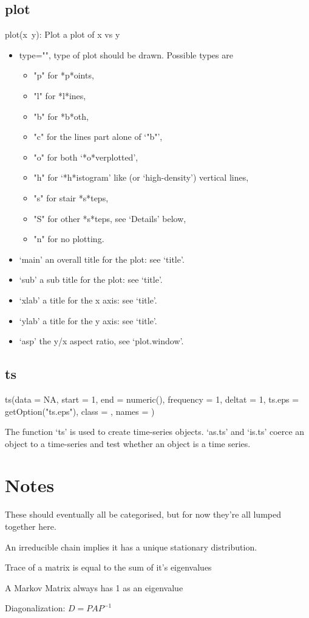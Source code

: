 \documentclass[12pt]{article}
\begin{document}
\subsection{plot} plot(x~y): Plot a plot of x vs y
\begin{itemize}
	\item type="", type of plot should be drawn.  Possible types are
		\begin{itemize}
			\item "p" for *p*oints,
			\item "l" for *l*ines,
			\item "b" for *b*oth,
			\item "c" for the lines part alone of ‘"b"’,
			\item "o" for both ‘*o*verplotted’,
			\item "h" for ‘*h*istogram’ like (or ‘high-density’) vertical lines,
			\item "s" for stair *s*teps,
			\item "S" for other *s*teps, see ‘Details’ below,
			\item "n" for no plotting.
		\end{itemize}
	\item ‘main’ an overall title for the plot: see ‘title’.
	\item ‘sub’ a sub title for the plot: see ‘title’.
	\item ‘xlab’ a title for the x axis: see ‘title’.
	\item ‘ylab’ a title for the y axis: see ‘title’.
	\item ‘asp’ the y/x aspect ratio, see ‘plot.window’.
\end{itemize}

\subsection{ts}
	ts(data = NA, start = 1, end = numeric(), frequency = 1, deltat = 1, ts.eps = getOption("ts.eps"), class = , names = )

	The function ‘ts’ is used to create time-series objects.
	‘as.ts’ and ‘is.ts’ coerce an object to a time-series and test
	whether an object is a time series.

\section{Notes}
    These should eventually all be categorised, but for now they're all lumped together here.

    An irreducible chain implies it has a unique stationary distribution.

    Trace of a matrix is equal to the sum of it's eigenvalues

    A Markov Matrix always has 1 as an eigenvalue

    Diagonalization: \(D = PAP^{-1}\)
\end{document}
